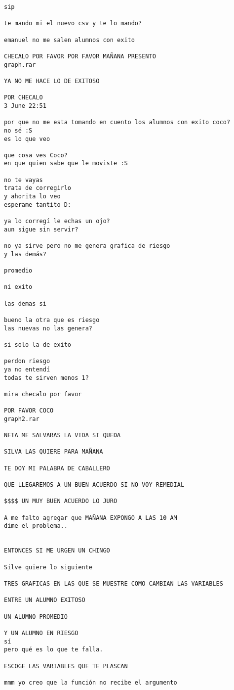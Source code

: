 \begin{verbatim}
sip

te mando mi el nuevo csv y te lo mando?

emanuel no me salen alumnos con exito

CHECALO POR FAVOR POR FAVOR MAÑANA PRESENTO
graph.rar

YA NO ME HACE LO DE EXITOSO

POR CHECALO 
3 June 22:51

por que no me esta tomando en cuento los alumnos con exito coco?
no sé :S
es lo que veo

que cosa ves Coco?
en que quien sabe que le moviste :S

no te vayas 
trata de corregirlo
y ahorita lo veo
esperame tantito D:

ya lo corregí le echas un ojo?
aun sigue sin servir?

no ya sirve pero no me genera grafica de riesgo
y las demás?

promedio

ni exito

las demas si

bueno la otra que es riesgo
las nuevas no las genera?

si solo la de exito

perdon riesgo
ya no entendí
todas te sirven menos 1?

mira checalo por favor

POR FAVOR COCO
graph2.rar

NETA ME SALVARAS LA VIDA SI QUEDA

SILVA LAS QUIERE PARA MAÑANA

TE DOY MI PALABRA DE CABALLERO

QUE LLEGAREMOS A UN BUEN ACUERDO SI NO VOY REMEDIAL

$$$$ UN MUY BUEN ACUERDO LO JURO

A me falto agregar que MAÑANA EXPONGO A LAS 10 AM
dime el problema..


ENTONCES SI ME URGEN UN CHINGO

Silve quiere lo siguiente

TRES GRAFICAS EN LAS QUE SE MUESTRE COMO CAMBIAN LAS VARIABLES

ENTRE UN ALUMNO EXITOSO

UN ALUMNO PROMEDIO

Y UN ALUMNO EN RIESGO
sí
pero qué es lo que te falla.

ESCOGE LAS VARIABLES QUE TE PLASCAN

mmm yo creo que la función no recibe el argumento


\end{verbatim}
